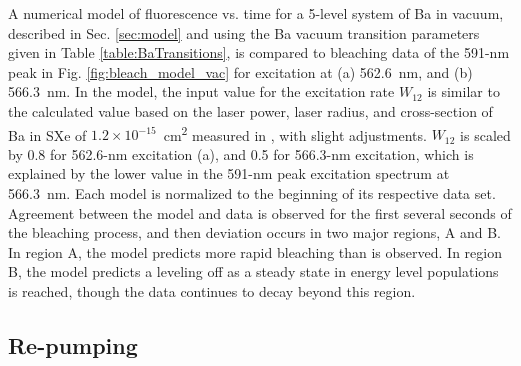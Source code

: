 A numerical model of fluorescence vs. time for a 5-level system of Ba in vacuum, described in Sec. \ref{sec:model} and using the Ba vacuum transition parameters given in Table \ref{table:BaTransitions}, is compared to bleaching data of the 591-nm peak in Fig. \ref{fig:bleach_model_vac} for excitation at (a) 562.6~nm, and (b) 566.3~nm.  In the model, the input value for the excitation rate $W_{12}$ is similar to the calculated value based on the laser power, laser radius, and cross-section of Ba in SXe of $1.2 \times 10^{-15}$~cm\textsuperscript{2} measured in \cite{Brian}, with slight adjustments.  $W_{12}$ is scaled by 0.8 for 562.6-nm excitation (a), and 0.5 for 566.3-nm excitation, which is explained by the lower value in the 591-nm peak excitation spectrum at 566.3~nm.  Each model is normalized to the beginning of its respective data set.  Agreement between the model and data is observed for the first several seconds of the bleaching process, and then deviation occurs in two major regions, A and B.  In region A, the model predicts more rapid bleaching than is observed.  In region B, the model predicts a leveling off as a steady state in energy level populations is reached, though the data continues to decay beyond this region.





\subsection{Re-pumping}

